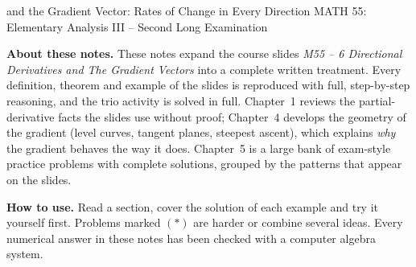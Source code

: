 \documentclass[11pt,a4paper]{article}
\begin{document}

  {and the Gradient Vector: Rates of Change in Every Direction}
  {MATH 55: Elementary Analysis III -- Second Long Examination}
  {\textbf{About these notes.} These notes expand the course slides
   \emph{M55 -- 6 Directional Derivatives and The Gradient Vectors} into a
   complete written treatment. Every definition, theorem and example of the
   slides is reproduced with full, step-by-step reasoning, and the trio
   activity is solved in full. Chapter~1 reviews the partial-derivative
   facts the slides use without proof; Chapter~4 develops the geometry of
   the gradient (level curves, tangent planes, steepest ascent), which
   explains \emph{why} the gradient behaves the way it does. Chapter~5 is a
   large bank of exam-style practice problems with complete solutions,
   grouped by the patterns that appear on the slides.\par\medskip
   \textbf{How to use.} Read a section, cover the solution of each example and
   try it yourself first. Problems marked $(*)$ are harder or combine several
   ideas. Every numerical answer in these notes has been checked with a
   computer algebra system.}

\tableofcontents
\clearpage
{}







\startappendix

\end{document}
